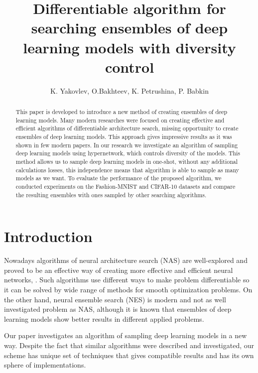 \documentclass{article}
\title{Differentiable algorithm for searching ensembles of deep learning models with diversity control}
\author{K. Yakovlev, O.Bakhteev, K. Petrushina, P. Babkin
}
\date{}
\begin{document}
\maketitle

\begin{abstract}
	
This paper is developed to introduce a new method of creating ensembles of deep learning models. 
Many modern researches were focused on creating effective and efficient algorithms of differentiable architecture search,
missing opportunity to create ensembles of deep learning models. This approach gives impressive results
as it was shown in few modern papers. In our research we investigate an algorithm of sampling deep learning models using
hypernetwork, which controls diversity of the models. This method allows us to sample deep learning models in one-shot,
without any additional calculations losses, this independence means that algorithm is able to sample as many models
as we want. To evaluate the performance of the proposed algorithm, we conducted experiments on the Fashion-MNIST and CIFAR-10
datasets and compare the resulting ensembles with ones sampled by other searching algorithms.

\end{abstract}



\section{Introduction}

Nowadays algorithms of neural architecture search (NAS) are well-explored and proved to be an effective way of creating
more effective and efficient neural networks, \citep{darts, robustify, xnas}. Such algorithms use different ways to make problem differentiable so it can
be solved by wide range of methods for smooth optimization problems. On the other hand, neural ensemble search (NES) is
modern and not as well investigated problem as NAS, although it is known that ensembles of deep learning models show better
results in different applied problems.

Our paper investigates an algorithm of sampling deep learning models in a new way. Despite the fact that similar algorithms
were described and investigated, our scheme has unique set of techniques that gives compatible results and has its own sphere
of implementations.
\end{document}
